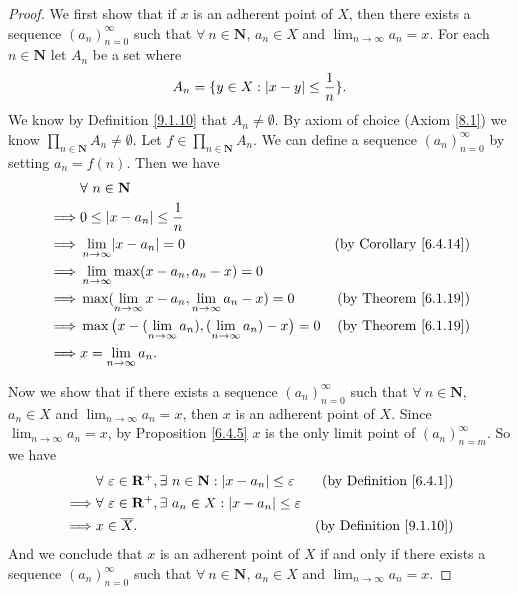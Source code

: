 \begin{proof}
    We first show that if \(x\) is an adherent point of \(X\), then there exists a sequence \((a_n)_{n = 0}^\infty\) such that \(\forall\ n \in \mathbf{N}\), \(a_n \in X\) and \(\lim_{n \to \infty} a_n = x\).
    For each \(n \in \mathbf{N}\) let \(A_n\) be a set where
    \[
        A_n = \{y \in X : \abs*{x - y} \leq \frac{1}{n}\}.
    \]
    We know by Definition \ref{9.1.10} that \(A_n \neq \emptyset\).
    By axiom of choice (Axiom \ref{8.1}) we know \(\prod_{n \in \mathbf{N}} A_n \neq \emptyset\).
    Let \(f \in \prod_{n \in \mathbf{N}} A_n\).
    We can define a sequence \((a_n)_{n = 0}^\infty\) by setting \(a_n = f(n)\).
    Then we have
    \begin{align*}
                 & \forall\ n \in \mathbf{N}                                                                                           \\
        \implies & 0 \leq \abs*{x - a_n} \leq \frac{1}{n}                                                                              \\
        \implies & \lim_{n \to \infty} \abs*{x - a_n} = 0                                         & \text{(by Corollary \ref{6.4.14})} \\
        \implies & \lim_{n \to \infty} \max(x - a_n, a_n - x) = 0                                                                      \\
        \implies & \max(\lim_{n \to \infty} x - a_n, \lim_{n \to \infty} a_n - x) = 0             & \text{(by Theorem \ref{6.1.19})}   \\
        \implies & \max\big(x - (\lim_{n \to \infty} a_n), (\lim_{n \to \infty} a_n) - x\big) = 0 & \text{(by Theorem \ref{6.1.19})}   \\
        \implies & x = \lim_{n \to \infty} a_n.
    \end{align*}

    Now we show that if there exists a sequence \((a_n)_{n = 0}^\infty\) such that \(\forall\ n \in \mathbf{N}\), \(a_n \in X\) and \(\lim_{n \to \infty} a_n = x\), then \(x\) is an adherent point of \(X\).
    Since \(\lim_{n \to \infty} a_n = x\), by Proposition \ref{6.4.5} \(x\) is the only limit point of \((a_n)_{n = m}^\infty\).
    So we have
    \begin{align*}
                 & \forall\ \varepsilon \in \mathbf{R}^+, \exists\ n \in \mathbf{N} : \abs*{x - a_n} \leq \varepsilon & \text{(by Definition \ref{6.4.1})}  \\
        \implies & \forall\ \varepsilon \in \mathbf{R}^+, \exists\ a_n \in X : \abs*{x - a_n} \leq \varepsilon                                              \\
        \implies & x \in \overline{X}.                                                                                & \text{(by Definition \ref{9.1.10})}
    \end{align*}
    And we conclude that \(x\) is an adherent point of \(X\) if and only if there exists a sequence \((a_n)_{n = 0}^\infty\) such that \(\forall\ n \in \mathbf{N}\), \(a_n \in X\) and \(\lim_{n \to \infty} a_n = x\).
\end{proof}
